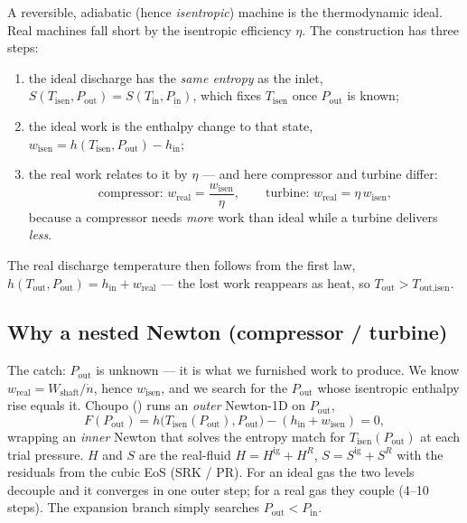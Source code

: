 \documentclass[11pt,a4paper]{article}
\begin{document}
A reversible, adiabatic (hence \emph{isentropic}) machine is the
thermodynamic ideal.  Real machines fall short by the isentropic
efficiency $\eta$.  The construction has three steps:
\begin{enumerate}[leftmargin=*,nosep,topsep=2pt]
  \item the ideal discharge has the \emph{same entropy} as the inlet,
        $S(T_{\text{isen}}, P_{\text{out}}) = S(T_{\text{in}},
        P_{\text{in}})$, which fixes $T_{\text{isen}}$ once
        $P_{\text{out}}$ is known;
  \item the ideal work is the enthalpy change to that state,
        $w_{\text{isen}} = h(T_{\text{isen}}, P_{\text{out}}) -
        h_{\text{in}}$;
  \item the real work relates to it by $\eta$ --- and here compressor
        and turbine differ:
        \begin{equation}
           \text{compressor: } w_{\text{real}} = \frac{w_{\text{isen}}}{\eta},
           \qquad
           \text{turbine: } w_{\text{real}} = \eta\,w_{\text{isen}},
        \end{equation}
        because a compressor needs \emph{more} work than ideal while a
        turbine delivers \emph{less}.
\end{enumerate}
The real discharge temperature then follows from the first law,
$h(T_{\text{out}}, P_{\text{out}}) = h_{\text{in}} + w_{\text{real}}$
--- the lost work reappears as heat, so $T_{\text{out}} >
T_{\text{out,isen}}$.

\subsection{Why a nested Newton (compressor / turbine)}

The catch: $P_{\text{out}}$ is unknown --- it is what we furnished work
to produce.  We know $w_{\text{real}} = W_{\text{shaft}}/\dot n$, hence
$w_{\text{isen}}$, and we search for the $P_{\text{out}}$ whose
isentropic enthalpy rise equals it.  Choupo ()
runs an \emph{outer} Newton-1D on $P_{\text{out}}$,
\begin{equation}
   F(P_{\text{out}}) =
   h\bigl(T_{\text{isen}}(P_{\text{out}}), P_{\text{out}}\bigr)
   - (h_{\text{in}} + w_{\text{isen}}) = 0,
\end{equation}
wrapping an \emph{inner} Newton that solves the entropy match for
$T_{\text{isen}}(P_{\text{out}})$ at each trial pressure.  $H$ and $S$
are the real-fluid $H = H^{\text{ig}} + H^{R}$, $S = S^{\text{ig}} +
S^{R}$ with the residuals from the cubic EoS (SRK / PR).  For an ideal
gas the two levels decouple and it converges in one outer step; for a
real gas they couple (4--10 steps).  The expansion branch simply
searches $P_{\text{out}}<P_{\text{in}}$.
\end{document}
